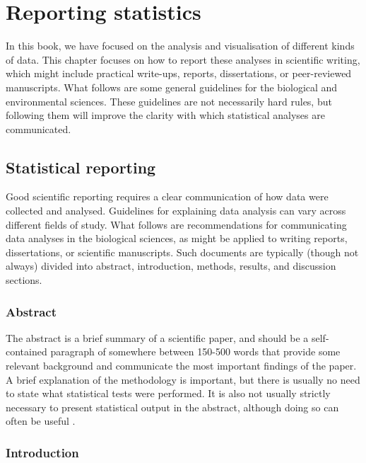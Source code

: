 \documentclass[
]{scrbook}
\begin{document}
\hypertarget{Chapter_38}{%
\chapter{Reporting statistics}\label{Chapter_38}}

In this book, we have focused on the analysis and visualisation of different kinds of data.
This chapter focuses on how to report these analyses in scientific writing, which might include practical write-ups, reports, dissertations, or peer-reviewed manuscripts.
What follows are some general guidelines for the biological and environmental sciences.
These guidelines are not necessarily hard rules, but following them will improve the clarity with which statistical analyses are communicated.

\hypertarget{statistical-reporting}{%
\section{Statistical reporting}\label{statistical-reporting}}

Good scientific reporting requires a clear communication of how data were collected and analysed.
Guidelines for explaining data analysis can vary across different fields of study.
What follows are recommendations for communicating data analyses in the biological sciences, as might be applied to writing reports, dissertations, or scientific manuscripts.
Such documents are typically (though not always) divided into abstract, introduction, methods, results, and discussion sections.

\hypertarget{abstract}{%
\subsection{Abstract}\label{abstract}}

The abstract is a brief summary of a scientific paper, and should be a self-contained paragraph of somewhere between 150-500 words that provide some relevant background and communicate the most important findings of the paper.
A brief explanation of the methodology is important, but there is usually no need to state what statistical tests were performed.
It is also not usually strictly necessary to present statistical output in the abstract, although doing so can often be useful \citep{Andrade2011}.

\hypertarget{introduction}{%
\subsection{Introduction}\label{introduction}}
\end{document}
